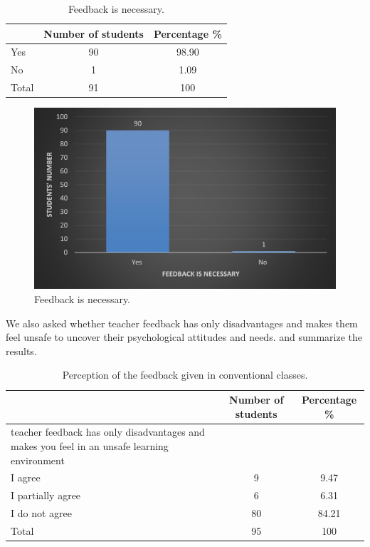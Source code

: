 \documentclass[english]{textolivre}
\begin{document}
\begin{table}[h!]
\centering
\begin{threeparttable}
\caption{Feedback is necessary.}
\label{tbl12}
\centering
\begin{tabular}{p{} c c}
\toprule
 & Number of students & Percentage \% \\ \midrule
Yes & 90 & 98.90 \\
No & 1 & 1.09 \\
Total & 91 & 100 \\
\bottomrule
\end{tabular}
\end{threeparttable}
\end{table}

\begin{figure}[h!]
 \centering
 \begin{minipage}{.85\textwidth}
 \includegraphics[width=\textwidth]{12.jpg}
 \caption{Feedback is necessary.}
 \label{fig12}
 \end{minipage}
\end{figure}

We also asked whether teacher feedback has only disadvantages and makes them feel unsafe to uncover their psychological attitudes and needs.  and  summarize the results.

\begin{table}[h!]
\centering
\begin{threeparttable}
\caption{Perception of the feedback given in conventional classes.}
\label{tbl13}
\begin{tabular}{p{} c c}
\toprule
 & Number of students & Percentage \% \\ \midrule
teacher feedback has only disadvantages and makes you feel in an unsafe
learning environment &  &  \\
I agree & 9 & 9.47 \\
I partially agree & 6 & 6.31 \\
I do not agree & 80 & 84.21 \\
Total & 95 & 100 \\
\bottomrule
\end{tabular}
\end{threeparttable}
\end{table}
\end{document}
